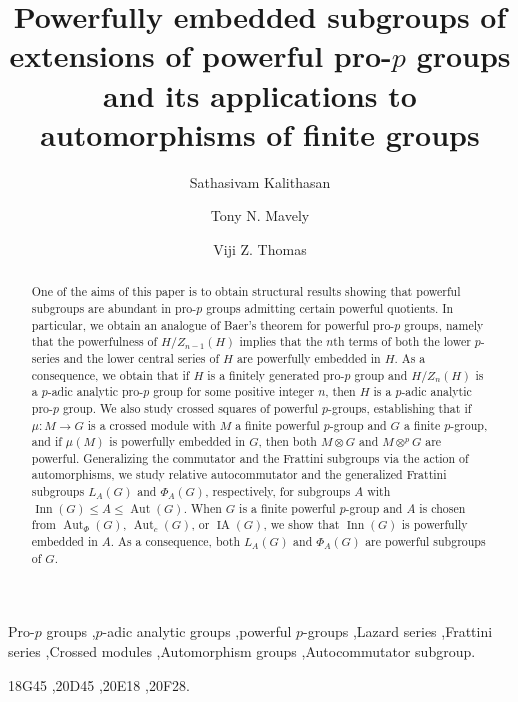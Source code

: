 \documentclass[12pt]{elsarticle}
\newtheorem*{main corollary*}{Main Corollary}
\theoremstyle{definition}
\begin{document}
\begin{frontmatter}

\title{Powerfully embedded subgroups of extensions of powerful pro-$p$ groups and its applications to automorphisms of finite groups}


 \author[IISER TVM]{Sathasivam Kalithasan}
 \author[IISER TVM]{Tony N. Mavely}
\author[IISER TVM]{Viji Z. Thomas}
\address[IISER TVM]{School of Mathematics,  Indian Institute of Science Education and Research Thiruvananthapuram,\\695551
Kerala, India.}

\begin{abstract}

One of the aims of this paper is to obtain structural results showing that powerful subgroups are abundant in pro-$p$ groups admitting certain powerful quotients. In particular, we obtain an analogue of Baer’s theorem for powerful pro-$p$ groups, namely that the powerfulness of $H/Z_{n-1}(H)$ implies that the $n$th terms of both the lower $p$-series and the lower central series of $H$ are powerfully embedded in $H$. As a consequence, we obtain that if $H$ is a finitely generated pro-$p$ group and $H/Z_n(H)$ is a $p$-adic analytic pro-$p$ group for some positive integer $n$, then $H$ is a $p$-adic analytic pro-$p$ group. We also study crossed squares of powerful $p$-groups, establishing that if $\mu : M \to G$ is a crossed module with $M$ a finite powerful $p$-group and $G$ a finite $p$-group, and if $\mu(M)$ is powerfully embedded in $G$, then both $M \otimes G$ and $M \otimes^{p} G$ are powerful. Generalizing the commutator and the Frattini subgroups via the action of automorphisms, we study relative autocommutator and the generalized Frattini subgroups $L_A(G)$ and $\Phi_A(G)$, respectively, for subgroups $A$ with $\operatorname{Inn}(G) \leqslant A \leqslant \operatorname{Aut}(G)$. When $G$ is a finite powerful $p$-group and $A$ is chosen from $\operatorname{Aut}_\Phi(G)$, $\operatorname{Aut}_c(G)$, or $\operatorname{IA}(G)$, we show that $\operatorname{Inn}(G)$ is powerfully embedded in $A$. As a consequence, both $L_A(G)$ and $\Phi_A(G)$ are powerful subgroups of $G$.




\end{abstract}

\begin{keyword}
Pro-$p$ groups \sep $p$-adic analytic groups \sep powerful $p$-groups \sep Lazard series \sep Frattini series \sep Crossed modules \sep Automorphism groups \sep Autocommutator subgroup. 

\MSC[2020] 18G45 \sep 20D45 \sep	20E18 \sep 20F28.
\end{keyword}

\end{frontmatter}
\end{document}
